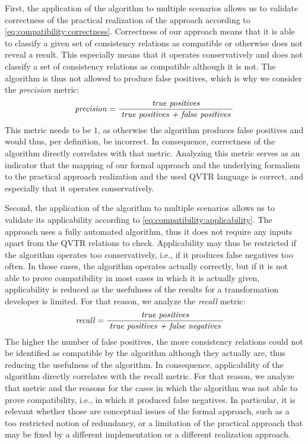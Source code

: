 First, the application of the algorithm to multiple scenarios allows us to validate correctness of the practical realization of the approach according to \autoref{eq:compatibility:correctness}.
Correctness of our approach means that it is able to classify a given set of consistency relations as compatible or otherwise does not reveal a result.
This especially means that it operates conservatively and does not classify a set of consistency relations as compatible although it is not.
The algorithm is thus not allowed to produce false positives, which is why we consider the \emph{precision} metric:
\begin{align*}
    \hspace{1em} &
    \mathit{precision} = \frac{\; \textit{true positives} \;}{\; \textit{true positives + false positives} \;}
\end{align*}
This metric needs to be $1$, as otherwise the algorithm produces false positives and would thus, per definition, be incorrect.
In consequence, correctness of the algorithm directly correlates with that metric.
Analyzing this metric serves as an indicator that the mapping of our formal approach and the underlying formalism to the practical approach realization and the used \gls{QVTR} language is correct, and especially that it operates conservatively.

Second, the application of the algorithm to multiple scenarios allows us to validate its applicability according to \autoref{eq:compatibility:applicability}.
The approach uses a fully automated algorithm, thus it does not require any inputs apart from the \gls{QVTR} relations to check.
Applicability may thus be restricted if the algorithm operates too conservatively, i.e., if it produces false negatives too often.
In those cases, the algorithm operates actually correctly, but if it is not able to prove compatibility in most cases in which it is actually given, applicability is reduced as the usefulness of the results for a transformation developer is limited.
For that reason, we analyze the \emph{recall} metric:
\begin{align*}
    &
    \mathit{recall} = \frac{\; \textit{true positives} \;}{\; \textit{true positives + false negatives} \;}
\end{align*}
The higher the number of false positives, the more consistency relations could not be identified as compatible by the algorithm although they actually are, thus reducing the usefulness of the algorithm.
In consequence, applicability of the algorithm directly correlates with the recall metric.
For that reason, we analyze that metric and the reasons for the cases in which the algorithm was not able to 
prove compatibility, i.e., in which it produced false negatives.
In particular, it is relevant whether those are conceptual issues of the formal approach, such as a too restricted notion of redundancy, or a limitation of the practical approach that may be fixed by a different implementation or a different realization approach.


